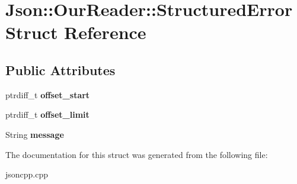\hypertarget{structJson_1_1OurReader_1_1StructuredError}{}\section{Json\+:\+:Our\+Reader\+:\+:Structured\+Error Struct Reference}
\label{structJson_1_1OurReader_1_1StructuredError}
\subsection*{Public Attributes}
\begin{DoxyCompactItemize}
\item 
\mbox{\label{structJson_1_1OurReader_1_1StructuredError_a102677698afb8177c985e72dafe72b15}} 
ptrdiff\+\_\+t {\bfseries offset\+\_\+start}
\item 
\mbox{\label{structJson_1_1OurReader_1_1StructuredError_a15491a751a39c5153af04e68b1d0abb9}} 
ptrdiff\+\_\+t {\bfseries offset\+\_\+limit}
\item 
\mbox{\label{structJson_1_1OurReader_1_1StructuredError_a9bc9ad673457044a897542a49b770d9b}} 
String {\bfseries message}
\end{DoxyCompactItemize}


The documentation for this struct was generated from the following file\+:\begin{DoxyCompactItemize}
\item 
jsoncpp.\+cpp\end{DoxyCompactItemize}
